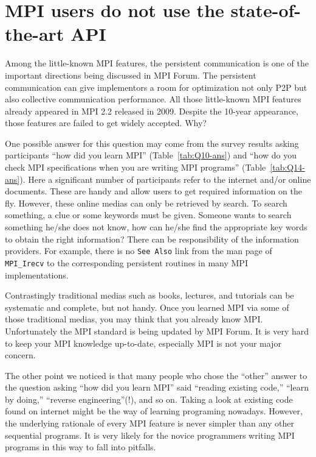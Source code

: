 \documentclass[sigconf,nonacm]{acmart}
\begin{document}
\section{MPI users do not use the state-of-the-art API}

Among the little-known MPI features, the persistent communication is
one of the important directions being discussed in MPI Forum\cite{mpi-forum}.
The persistent communication can give implementors a room for
optimization not only P2P but also collective communication
performance.
All those little-known MPI features already appeared in MPI 2.2
released in 2009. Despite the 10-year appearance, those features
are failed to get widely accepted.  Why?

One possible answer for this question may come from the survey results
asking participants ``how did you learn MPI''
(Table~\ref{tab:Q10-ans}) and ``how do you check
MPI specifications when you are writing MPI programs''
(Table~\ref{tab:Q14-ans}).
Here a significant number of participants refer to the internet
and/or online documents. These are handy and allow users to get
required information on the fly. However,
these online medias can only be retrieved by
search. To search something, a clue or some keywords must be given.
Someone wants to search something he/she does not know, how can he/she
find the appropriate key words to obtain the right information?
There can be responsibility of the information providers. For example,
there is no {\tt See Also} link from the man page of {\tt MPI\_Irecv}
to the corresponding persistent routines in many MPI implementations.

Contrastingly traditional medias such as books, lectures, and tutorials can be
systematic and complete, but not handy.  Once you learned MPI via some
of those traditional medias, you may think that you already know
MPI. Unfortunately the MPI standard is being updated by MPI Forum. It is
very hard to keep your MPI knowledge up-to-date, especially MPI is not
your major concern.

The other point we noticed is that many people who chose the ``other''
answer to the question asking ``how did you learn MPI'' said
``reading existing code,'' ``learn by doing,'' ``reverse
engineering''(!),  and so on. Taking a look at existing code found on
internet might be the way of learning programing nowadays. However,
the underlying rationale of every MPI feature is never simpler than
any other sequential programs. It is very likely for the novice
programmers writing MPI programs in this way to fall into pitfalls.
\end{document}
